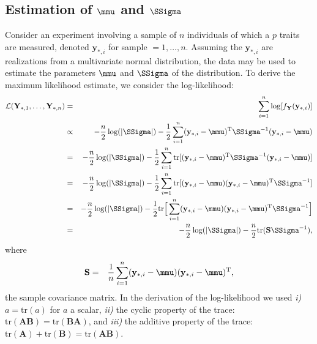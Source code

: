 \documentclass[a4paper]{article}
\theoremstyle{myexamplestyle}
\begin{document}
\subsection{Estimation of $\mmu$ and $\SSigma$}
Consider an experiment involving a sample of $n$ individuals of which a $p$ traits are measured, denoted $\mathbf{y}_{\ast,i}$ for sample $ = 1, \ldots, n$. Assuming the $\mathbf{y}_{\ast,i}$ are realizations from a multivariate normal distribution, the data may be used to estimate the parameters $\mmu$ and $\SSigma$ of the distribution. To derive the maximum likelihood estimate, we consider the log-likelihood:
\begin{eqnarray*}
\mathcal{L}(\mathbf{Y}_{\ast, 1}, \ldots, \mathbf{Y}_{\ast, n}) & = & \sum_{i=1}^n \log [ f_{\mathbf{Y}}(\mathbf{y}_{\ast,i})]
\\
& \propto &  - \frac{n}{2} \log ( | \SSigma | ) - \frac{1}{2} \sum_{i=1}^n (\mathbf{y}_{\ast,i} - \mmu)^{\mathrm{T}} \SSigma^{-1} (\mathbf{y}_{\ast,i} - \mmu)
\\
& = &  - \frac{n}{2} \log ( | \SSigma | ) - \frac{1}{2} \sum_{i=1}^n \mbox{tr}[ (\mathbf{y}_{\ast,i} - \mmu)^{\mathrm{T}} \SSigma^{-1} (\mathbf{y}_{\ast,i} - \mmu)]
\\
& = &  - \frac{n}{2} \log ( | \SSigma | ) - \frac{1}{2} \sum_{i=1}^n \mbox{tr}[ (\mathbf{y}_{\ast,i} - \mmu) (\mathbf{y}_{\ast,i} - \mmu)^{\mathrm{T}} \SSigma^{-1} ]
\\
& = &  - \frac{n}{2} \log ( | \SSigma | ) - \frac{1}{2}  \mbox{tr} \Big[ \sum_{i=1}^n (\mathbf{y}_{\ast,i} - \mmu) (\mathbf{y}_{\ast,i} - \mmu)^{\mathrm{T}} \SSigma^{-1} \Big]
\\
& = &  - \frac{n}{2} \log ( | \SSigma | ) - \frac{n}{2}  \mbox{tr}( \mathbf{S} \SSigma^{-1} ),
\end{eqnarray*}
where
\begin{eqnarray*}
\mathbf{S} & = & \frac{1}{n} \sum_{i=1}^n (\mathbf{y}_{\ast,i} - \mmu) (\mathbf{y}_{\ast,i} - \mmu)^{\mathrm{T}},
\end{eqnarray*}
the sample covariance matrix. In the derivation of the log-likelihood we used {\it i)} $a  = \mbox{tr}(a)$ for $a$ a scalar, {\it ii)} the cyclic property of the trace: $\mbox{tr}( \mathbf{A} \mathbf{B} )   = \mbox{tr}( \mathbf{B} \mathbf{A} )$, and {\it iii)} the additive property of the trace: $\mbox{tr}( \mathbf{A}) + \mbox{tr}( \mathbf{B} ) = \mbox{tr}( \mathbf{A} \mathbf{B} )$.
\end{document}

